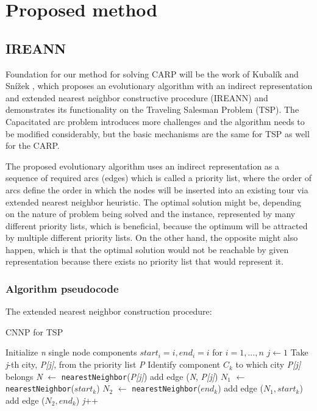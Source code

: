 \documentclass[oneside]{ctuthesis}
\theoremstyle{plain}
\theoremstyle{definition}
\theoremstyle{note}
\begin{document}
\chapter{Proposed method}


\section{IREANN}
Foundation for our method for solving CARP will be the work of Kubalík and Snížek \cite{kubalik2014novel}, which proposes an evolutionary algorithm with an indirect representation and extended nearest neighbor constructive procedure (IREANN) and demonstrates its functionality on the Traveling Salesman Problem (TSP). The Capacitated arc problem introduces more challenges and the algorithm needs to be modified considerably, but the basic mechanisms are the same for TSP as well for the CARP.

The proposed evolutionary algorithm uses an indirect representation as a sequence of required arcs (edges) which is called a priority list, where the order of arcs define the order in which the nodes will be inserted into an existing tour via extended nearest neighbor heuristic.
The optimal solution might be, depending on the nature of problem being solved and the instance, represented by many different priority lists, which is beneficial, because the optimum will be attracted by multiple different priority lists. On the other hand, the opposite might also happen, which is that the optimal solution would not be reachable by given representation because there exists no priority list that would represent it.

\subsection{Algorithm pseudocode}
 The extended nearest neighbor construction procedure:
\begin{algorithm}
 	\caption{CNNP for TSP}\label{alg:cap}
\begin{algorithmic}[1]
\State Initialize \emph{n} single node components \emph{$ start_i = i, end_i = i $} for \emph{$ i = 1, ..., n $}
\State $j \gets 1$
\Do
\State Take \emph{j}-th city, \emph{P[j]}, from the priority list \emph{P}
\State Identify component \emph{$ C_k $} to which city \emph{P[j]} belongs
\State \emph{N} $\gets$ {\tt nearestNeighbor}(\emph{P[j]})
\State add edge (\emph{N}, \emph{P[j]})
\Else
\State \emph{$ N_1 $} $\gets$ {\tt nearestNeighbor}(\emph{$ start_k $})
\State \emph{$ N_2 $} $\gets$ {\tt nearestNeighbor}(\emph{$ end_k $})
\State add edge (\emph{$ N_1, start_k $})
\Else
\State add edge (\emph{$ N_2, end_k $})
\EndIf
\EndIf
\State \emph{j}++

\end{algorithmic}
\end{algorithm}
\end{document}
